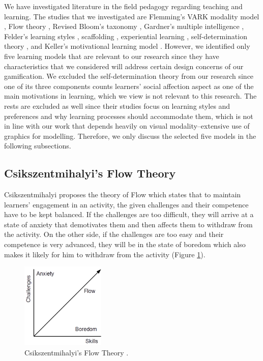 \documentclass[12pt, a4paper]{report}
\begin{document}
We have investigated literature in the field pedagogy regarding teaching and learning. The studies that we investigated are Flemming's VARK modality model \cite{fleming2006learning}, Flow theory \cite{csikszentmihalyi2014toward}, Revised Bloom's taxonomy \cite{krathwohl2002revision}, Gardner's multiple intelligence \cite{gardner2011frames}, Felder's learning styles \cite{felder1988learning},  scaffolding \cite{wood1976role, vygotsky1978mind}, experiential learning \cite{kolb2014experiential}, self-determination theory \cite{ryan2000self}, and Keller's motivational learning model \cite{keller2010motivational}. However, we identified only five learning models that are relevant to our research since they have characteristics that we considered will address certain design concerns of our gamification. We excluded the self-determination theory from our research since one of its three components counts learners' social affection aspect as one of the main motivations in learning, which we view is not relevant to this research. The rests are excluded as well since their studies focus on learning styles and preferences and why learning processes should accommodate them, which is not in line with our work that depends heavily on visual modality--extensive use of graphics for modelling. Therefore, we only discuss the selected five models in the following subsections.

\subsection{Csikszentmihalyi's Flow Theory}
Csikszentmihalyi \cite{csikszentmihalyi2014toward} proposes the theory of Flow which states that to maintain learners' engagement in an activity, the given challenges and their competence have to be kept balanced. If the challenges are too difficult, they will arrive at a state of anxiety that demotivates them and then affects them to withdraw from the activity. On the other side, if the challenges are too easy and their competence is very advanced, they will be in the state of boredom which also makes it likely for him to withdraw from the activity (Figure \ref{flow-theory}).

\begin{figure}[ht]
\centering
\includegraphics[width=4cm]{flow-theory}
\caption{Csikszentmihalyi's Flow Theory \cite{csikszentmihalyi2014toward}.}
\label{flow-theory}
\end{figure}
 
\end{document}

